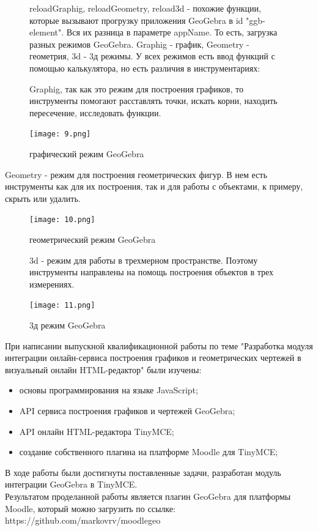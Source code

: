 \documentclass[14pt,Diplom]{diplomwork}
\begin{document}
\begin{itemize}

	\begin{figure}
		reloadGraphig, reloadGeometry, reload3d - похожие функции, которые вызывают прогрузку приложения GeoGebra в id "ggb-element". Вся их разница в параметре appName. То есть, загрузка разных режимов GeoGebra. Graphig - график, Geometry - геометрия, 3d - 3д режимы. У всех режимов есть ввод функций с помощью калькулятора, но есть различия в инструментариях:\\
			
			\item Graphig, так как это режим для построения графиков, то инструменты помогают расставлять точки, искать корни, находить пересечение, исследовать функции.
			\begin{center}
				\texttt{[image: 9.png]}\caption{графический режим GeoGebra}
			\end{center}
		\end{figure}
	
	
		\item Geometry - режим для построения геометрических фигур. В нем есть инструменты как для их построения, так и для работы с объектами, к примеру, скрыть или удалить.
		\begin{figure}
			\begin{center}
				\texttt{[image: 10.png]}\caption{геометрический режим GeoGebra}
			\end{center}
		\end{figure}


		\begin{figure} 
			\item 3d - режим для работы в трехмерном пространстве. Поэтому инструменты направлены на помощь построения объектов в трех измерениях.
			\begin{center}
				\texttt{[image: 11.png]}\caption{3д режим GeoGebra}
			\end{center}
		\end{figure}
\end{itemize}



	  



При написании выпускной квалификационной работы по теме "Разработка модуля интеграции онлайн-сервиса построения графиков и геометрических чертежей в визуальный онлайн HTML-редактор" были изучены:
\begin{itemize}
	\item основы программирования на языке JavaScript;
	\item API сервиса построения графиков и чертежей GeoGebra;
	\item API онлайн HTML-редактора TinyMCE;
	\item создание собственного плагина на платформе Moodle для TinyMCE;
\end{itemize}
В ходе работы были достигнуты поставленные задачи, разработан модуль интеграции GeoGebra в TinyMCE.\\
Результатом проделанной работы является плагин GeoGebra для платформы Moodle, который можно загрузить по ссылке: https://github.com/markovrv/moodlegeo
\end{document}
